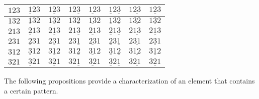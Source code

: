 \begin{center}
\begin{tabular}{|l|l|l|l|l|l|l|l|}
\hline
\cellcolor{white}$123$ & \cellcolor{white}$\underline{1}23$ & \cellcolor{white}$1\underline{2}3$ & \cellcolor{white}$12\underline{3}$ & \cellcolor{white}$\underline{12}3$ & \cellcolor{white}$\underline{1}2\underline{3}$ & \cellcolor{white}$1\underline{23}$ & \cellcolor{white}$\underline{123}$ \\
\hline
\cellcolor{white}$132$ & \cellcolor{white}$\underline{1}32$ & \cellcolor{white}$1\underline{3}2$ & \cellcolor{white}$13\underline{2}$ & \cellcolor{white}$\underline{13}2$ & \cellcolor{white}$\underline{1}3\underline{2}$ & \cellcolor{white}$1\underline{32}$ & \cellcolor{white}$\underline{132}$ \\
\hline
\cellcolor{white}$213$ & \cellcolor{white}$\underline{2}13$ & \cellcolor{white}$2\underline{1}3$ & \cellcolor{white}$21\underline{3}$ & \cellcolor{white}$\underline{21}3$ & \cellcolor{white}$\underline{2}1\underline{3}$ & \cellcolor{white}$2\underline{13}$ & \cellcolor{white}$\underline{213}$ \\
\hline
\cellcolor{white}$231$ & \cellcolor{white}$\underline{2}31$ & \cellcolor{white}$2\underline{3}1$ & \cellcolor{white}$23\underline{1}$ & \cellcolor{white}$\underline{23}1$ & \cellcolor{white}$\underline{2}3\underline{1}$ & \cellcolor{white}$2\underline{31}$ & \cellcolor{white}$\underline{231}$ \\
\hline
\cellcolor{white}$312$ & \cellcolor{white}$\underline{3}12$ & \cellcolor{white}$3\underline{1}2$ &\cellcolor{white}$31\underline{2}$ & \cellcolor{white}$\underline{31}2$ & \cellcolor{white}$\underline{3}1\underline{2}$ & \cellcolor{white}$3\underline{12}$ & \cellcolor{white}$\underline{312}$ \\
\hline
\cellcolor{white}$321$ & \cellcolor{white}$\underline{3}21$ & \cellcolor{white}$3\underline{2}1$ & \cellcolor{white}$32\underline{1}$ & \cellcolor{white}$\underline{32}1$ & \cellcolor{white}$\underline{3}2\underline{1}$ & \cellcolor{white}$3\underline{21}$ & \cellcolor{white}$\underline{321}$\\
\hline
\end{tabular}
\end{center}

The following propositions provide a characterization of an element that contains a certain pattern.

